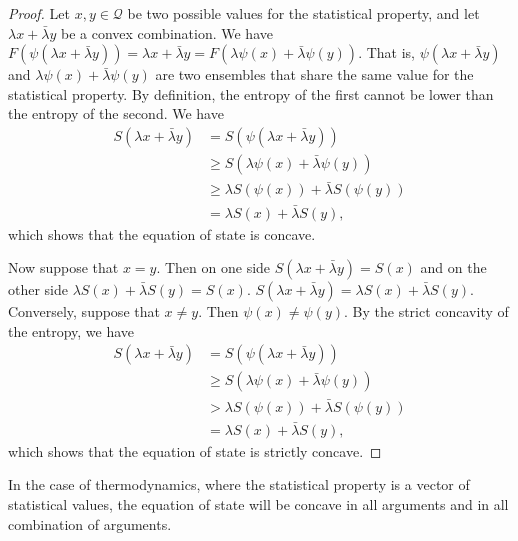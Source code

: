 \begin{proof}
	Let $x, y \in \mathcal{Q}$ be two possible values for the statistical property, and let $\lambda x + \bar{\lambda} y$ be a convex combination. We have $F(\psi(\lambda x + \bar{\lambda} y)) = \lambda x + \bar{\lambda} y = F(\lambda \psi(x) + \bar{\lambda} \psi(y))$. That is, $\psi(\lambda x + \bar{\lambda} y)$ and $\lambda \psi(x) + \bar{\lambda} \psi(y)$ are two ensembles that share the same value for the statistical property. By definition, the entropy of the first cannot be lower than the entropy of the second. We have
	\begin{equation}
		\begin{aligned}
			S(\lambda x + \bar{\lambda} y) &= S(\psi(\lambda x + \bar{\lambda} y)) \\
			&\geq S(\lambda \psi(x) + \bar{\lambda} \psi(y)) \\
			&\geq \lambda S(\psi(x)) + \bar{\lambda} S(\psi(y)) \\
			&= \lambda S(x) + \bar{\lambda} S(y),
		\end{aligned}
	\end{equation}
	which shows that the equation of state is concave.
	
	Now suppose that $x=y$. Then on one side $S(\lambda x + \bar{\lambda} y) = S(x)$ and on the other side $\lambda S(x) + \bar{\lambda} S(y) = S(x)$. $S(\lambda x + \bar{\lambda} y) = \lambda S(x) + \bar{\lambda} S(y)$. Conversely, suppose that $x\neq y$. Then $\psi(x) \neq \psi(y)$. By the strict concavity of the entropy, we have
	\begin{equation}
		\begin{aligned}
			S(\lambda x + \bar{\lambda} y) &= S(\psi(\lambda x + \bar{\lambda} y)) \\
			&\geq S(\lambda \psi(x) + \bar{\lambda} \psi(y)) \\
			&> \lambda S(\psi(x)) + \bar{\lambda} S(\psi(y)) \\
			&= \lambda S(x) + \bar{\lambda} S(y),
		\end{aligned}
	\end{equation}
	which shows that the equation of state is strictly concave.
\end{proof}

\begin{remark}
	In the case of thermodynamics, where the statistical property is a vector of statistical values, the equation of state will be concave in all arguments and in all combination of arguments.
\end{remark}


